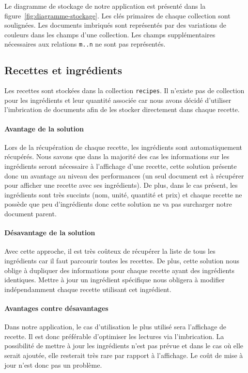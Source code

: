 		Le diagramme de stockage de notre application est présenté dans la figure~\ref{fig:diagramme-stockage}. Les clés primaires de chaque collection sont soulignées. Les documents imbriqués sont représentés par des variations de couleurs dans les champs d'une collection. Les champs supplémentaires nécessaires aux relations \texttt{m..n} ne sont pas représentés.

	\subsection{Recettes et ingrédients}

		Les recettes sont stockées dans la collection \verb|recipes|. Il n'existe pas de collection pour les ingrédients et leur quantité associée car nous avons décidé d'utiliser l'imbrication de documents afin de les stocker directement dans chaque recette.

		\paragraph{Avantage de la solution}%
			Lors de la récupération de chaque recette, les ingrédients sont automatiquement récupérés. Nous savons que dans la majorité des cas les informations sur les ingrédients seront nécessaire à l'affichage d'une recette, cette solution présente donc un avantage au niveau des performances (un seul document est à récupérer pour afficher une recette avec ses ingrédients). De plus, dans le cas présent, les ingrédients sont très succints (nom, unité, quantité et prix) et chaque recette ne possède que peu d'ingrédients donc cette solution ne va pas surcharger notre document parent.

		\paragraph{Désavantage de la solution}%
		\label{par:desavantage_de_la_solution}
			Avec cette approche, il est très coûteux de récupérer la liste de tous les ingrédients car il faut parcourir toutes les recettes. De plus, cette solution nous oblige à dupliquer des informations pour chaque recette ayant des ingrédients identiques. Mettre à jour un ingrédient spécifique nous obligera à modifier indépendamment chaque recette utilisant cet ingrédient.

		\paragraph{Avantages contre désavantages}%
			Dans notre application, le cas d'utilisation le plus utilisé sera l'affichage de recette. Il est donc préférable d'optimiser les lectures via l'imbrication. La possibilité de mettre à jour les ingrédients n'est pas prévue et dans le cas où elle serait ajoutée, elle resterait très rare par rapport à l'affichage. Le coût de mise à jour n'est donc pas un problème.

